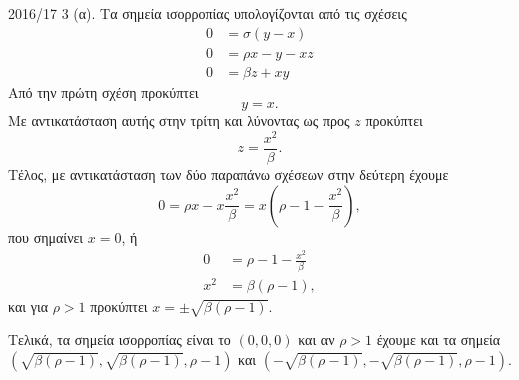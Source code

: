 \begin{solution}{2016/17 3}
    (α). Τα σημεία ισορροπίας υπολογίζονται από τις σχέσεις
    \begin{align*}
        0 &= \sigma(y - x) \\
        0 &= \rho x - y - xz \\
        0 &= \beta z + xy
    \end{align*}
    Από την πρώτη σχέση προκύπτει
    \[
        y = x.
    \]
    Με αντικατάσταση αυτής στην τρίτη
    και λύνοντας ως προς \( z \) προκύπτει
    \[
        z = \frac{x^2}{\beta}.
    \]
    Τέλος, με αντικατάσταση των δύο παραπάνω σχέσεων στην δεύτερη έχουμε
    \[
        0 = \rho x - x \frac{x^2}{\beta} = x \left( \rho -1 - \frac{x^2}{\beta}
        \right),
    \]
    που σημαίνει \( x = 0 \), ή
    \begin{align*}
        0 &= \rho -1 - \frac{x^2}{\beta} \\
        x^2 &= \beta(\rho - 1),
    \end{align*}
    και για \( \rho > 1 \) προκύπτει \( x = \pm\sqrt{\beta(\rho - 1)} \).

    Τελικά, τα σημεία ισορροπίας είναι το \( \left(0, 0, 0\right) \) και αν \( \rho > 1 \) έχουμε
    και τα σημεία \( \left(\sqrt{\beta(\rho - 1)}, \sqrt{\beta(\rho - 1)}, \rho
    -1\right) \) και \( \left( -\sqrt{\beta(\rho - 1)}, -\sqrt{\beta(\rho - 1)},
    \rho -1 \right) \).


\end{solution}
